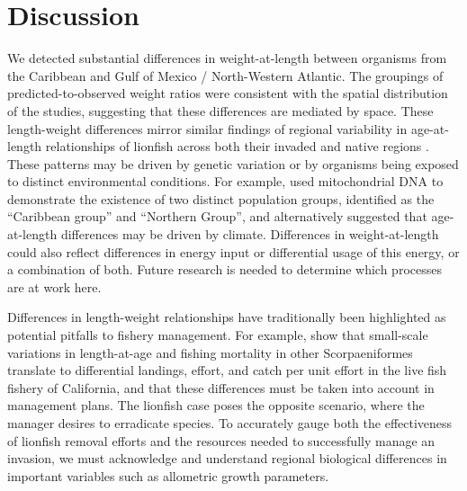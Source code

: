 \documentclass[fleqn,10pt,lineno]{wlpeerj} %
\begin{document}
\clearpage

\section*{Discussion}

We detected substantial differences in weight-at-length between
organisms from the Caribbean and Gulf of Mexico / North-Western
Atlantic. The groupings of predicted-to-observed weight ratios were
consistent with the spatial distribution of the studies, suggesting that
these differences are mediated by space. These length-weight differences
mirror similar findings of regional variability in age-at-length
relationships of lionfish across both their invaded and native regions
\citep{pusack_2016}. These patterns may be driven by genetic variation
or by organisms being exposed to distinct environmental conditions. For
example, \citet{betancurr_2011} used mitochondrial DNA to demonstrate
the existence of two distinct population groups, identified as the
``Caribbean group'' and ``Northern Group'', and \citet{fogg_2015}
alternatively suggested that age-at-length differences may be driven by
climate. Differences in weight-at-length could also reflect differences
in energy input or differential usage of this energy, or a combination
of both. Future research is needed to determine which processes are at
work here.

Differences in length-weight relationships have traditionally been
highlighted as potential pitfalls to fishery management. For example,
\citet{wilson_2012} show that small-scale variations in length-at-age
and fishing mortality in other Scorpaeniformes translate to differential
landings, effort, and catch per unit effort in the live fish fishery of
California, and that these differences must be taken into account in
management plans. The lionfish case poses the opposite scenario, where
the manager desires to erradicate species. To accurately gauge both the
effectiveness of lionfish removal efforts and the resources needed to
successfully manage an invasion, we must acknowledge and understand
regional biological differences in important variables such as
allometric growth parameters.
\end{document}
